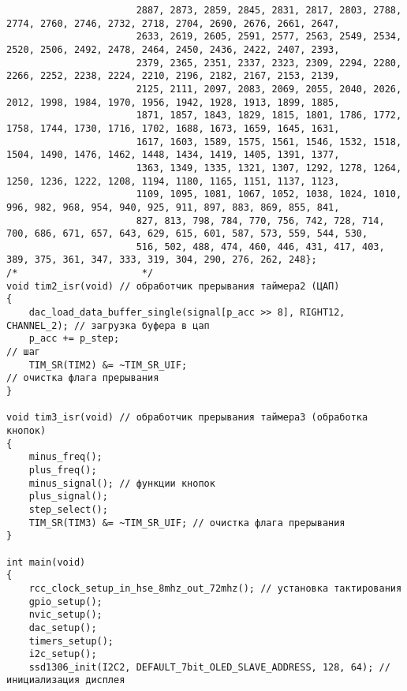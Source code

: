 \begin{code}
\begin{verbatim}
                       2887, 2873, 2859, 2845, 2831, 2817, 2803, 2788, 2774, 2760, 2746, 2732, 2718, 2704, 2690, 2676, 2661, 2647,
                       2633, 2619, 2605, 2591, 2577, 2563, 2549, 2534, 2520, 2506, 2492, 2478, 2464, 2450, 2436, 2422, 2407, 2393,
                       2379, 2365, 2351, 2337, 2323, 2309, 2294, 2280, 2266, 2252, 2238, 2224, 2210, 2196, 2182, 2167, 2153, 2139,
                       2125, 2111, 2097, 2083, 2069, 2055, 2040, 2026, 2012, 1998, 1984, 1970, 1956, 1942, 1928, 1913, 1899, 1885,
                       1871, 1857, 1843, 1829, 1815, 1801, 1786, 1772, 1758, 1744, 1730, 1716, 1702, 1688, 1673, 1659, 1645, 1631,
                       1617, 1603, 1589, 1575, 1561, 1546, 1532, 1518, 1504, 1490, 1476, 1462, 1448, 1434, 1419, 1405, 1391, 1377,
                       1363, 1349, 1335, 1321, 1307, 1292, 1278, 1264, 1250, 1236, 1222, 1208, 1194, 1180, 1165, 1151, 1137, 1123,
                       1109, 1095, 1081, 1067, 1052, 1038, 1024, 1010, 996, 982, 968, 954, 940, 925, 911, 897, 883, 869, 855, 841,
                       827, 813, 798, 784, 770, 756, 742, 728, 714, 700, 686, 671, 657, 643, 629, 615, 601, 587, 573, 559, 544, 530,
                       516, 502, 488, 474, 460, 446, 431, 417, 403, 389, 375, 361, 347, 333, 319, 304, 290, 276, 262, 248};
/*                      */
void tim2_isr(void) // обработчик прерывания таймера2 (ЦАП)
{
    dac_load_data_buffer_single(signal[p_acc >> 8], RIGHT12, CHANNEL_2); // загрузка буфера в цап
    p_acc += p_step;                                                     // шаг
    TIM_SR(TIM2) &= ~TIM_SR_UIF;                                         // очистка флага прерывания
}

void tim3_isr(void) // обработчик прерывания таймера3 (обработка кнопок)
{
    minus_freq();
    plus_freq();
    minus_signal(); // функции кнопок
    plus_signal();
    step_select();
    TIM_SR(TIM3) &= ~TIM_SR_UIF; // очистка флага прерывания
}

int main(void)
{
    rcc_clock_setup_in_hse_8mhz_out_72mhz(); // установка тактирования
    gpio_setup();
    nvic_setup();
    dac_setup();
    timers_setup();
    i2c_setup();
    ssd1306_init(I2C2, DEFAULT_7bit_OLED_SLAVE_ADDRESS, 128, 64); // инициализация дисплея


\end{verbatim}
\end{code}
